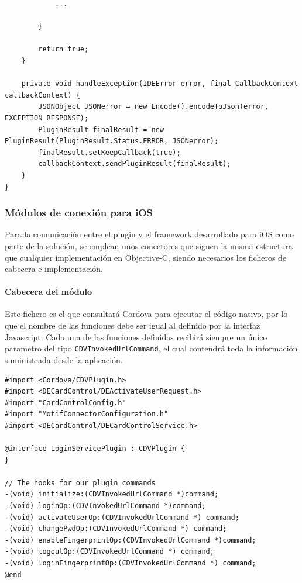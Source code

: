 \documentclass[a4paper, 12pt]{article}
\newenvironment{code}{\captionsetup{type=listing}}{}
\begin{document}
\begin{code}
\begin{verbatim}
            ...

        }

        return true;
    }

    private void handleException(IDEError error, final CallbackContext callbackContext) {
        JSONObject JSONerror = new Encode().encodeToJson(error, EXCEPTION_RESPONSE);
        PluginResult finalResult = new PluginResult(PluginResult.Status.ERROR, JSONerror);
        finalResult.setKeepCallback(true);
        callbackContext.sendPluginResult(finalResult);
    }
}

\end{verbatim}
\end{code}
\bigbreak
\subsubsection{Módulos de conexión para iOS}
\label{sec-4-3-3}
Para la comunicación entre el plugin y el framework desarrollado para iOS como parte de la solución, se emplean unos conectores que siguen la misma estructura que cualquier implementación en Objective-C,
siendo necesarios los ficheros de cabecera e implementación.
\paragraph{Cabecera del módulo}
\label{sec-4-3-3-1}
Este fichero es el que consultará Cordova para ejecutar el código nativo, por lo que el nombre de las funciones debe ser igual al definido por la interfaz Javascript. Cada una de las funciones definidas
recibirá siempre un único parametro del tipo \verb~CDVInvokedUrlCommand~, el cual contendrá toda la información suministrada desde la aplicación.
\begin{code}
\label{code:cordova-ios-interface}
\begin{verbatim}
#import <Cordova/CDVPlugin.h>
#import <DECardControl/DEActivateUserRequest.h>
#import "CardControlConfig.h"
#import "MotifConnectorConfiguration.h"
#import <DECardControl/DECardControlService.h>

@interface LoginServicePlugin : CDVPlugin {
}

// The hooks for our plugin commands
-(void) initialize:(CDVInvokedUrlCommand *)command;
-(void) loginOp:(CDVInvokedUrlCommand *)command;
-(void) activateUserOp:(CDVInvokedUrlCommand *) command;
-(void) changePwdOp:(CDVInvokedUrlCommand *) command;
-(void) enableFingerprintOp:(CDVInvokedUrlCommand *)command;
-(void) logoutOp:(CDVInvokedUrlCommand *) command;
-(void) loginFingerprintOp:(CDVInvokedUrlCommand *) command;
@end

\end{verbatim}
\end{code}
\bigbreak
\end{document}

